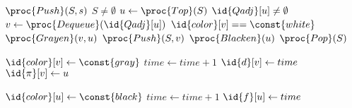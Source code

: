 \begin{codebox}
\li $\proc{Push}(S, s)$
\li \While $S \neq \emptyset$
\li \Do
        $u \gets \proc{Top}(S)$
\li     \If $\id{Qadj}[u] \neq \emptyset$
\li     \Then
            $v \gets \proc{Dequeue}(\id{Qadj}[u])$
\li         \If $\id{color}[v] == \const{white}$
\li         \Then
                $\proc{Grayen}(v, u)$
\li             $\proc{Push}(S, v)$
\li         \End
        \Else
\li         $\proc{Blacken}(u)$
\li         $\proc{Pop}(S)$
        \End
    \End
\end{codebox}

\begin{codebox}
\li $\id{color}[v] \gets \const{gray}$
\li $time \gets time + 1$
\li $\id{d}[v] \gets time$
\li $\id{\pi}[v] \gets u$
\end{codebox}

\begin{codebox}
\li $\id{color}[u] \gets \const{black}$
\li $time \gets time + 1$
\li $\id{f}[u] \gets time$
\end{codebox}